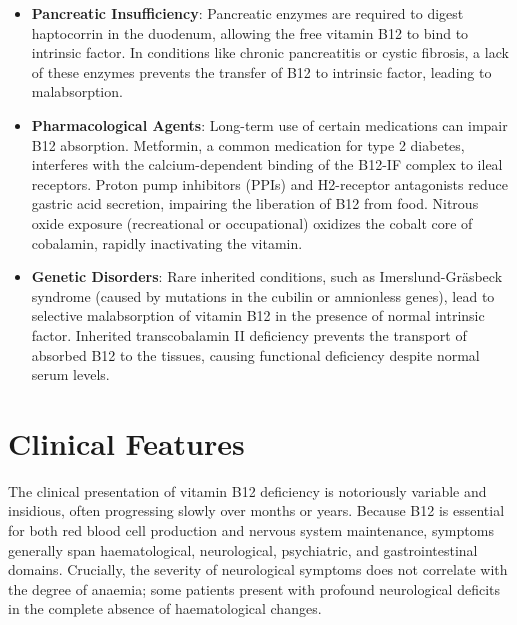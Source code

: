\begin{itemize}
    \item \textbf{Pancreatic Insufficiency}: Pancreatic enzymes are required to digest haptocorrin in the duodenum, allowing the free vitamin B12 to bind to intrinsic factor. In conditions like chronic pancreatitis or cystic fibrosis, a lack of these enzymes prevents the transfer of B12 to intrinsic factor, leading to malabsorption.
    \item \textbf{Pharmacological Agents}: Long-term use of certain medications can impair B12 absorption. Metformin, a common medication for type 2 diabetes, interferes with the calcium-dependent binding of the B12-IF complex to ileal receptors. Proton pump inhibitors (PPIs) and H2-receptor antagonists reduce gastric acid secretion, impairing the liberation of B12 from food. Nitrous oxide exposure (recreational or occupational) oxidizes the cobalt core of cobalamin, rapidly inactivating the vitamin.
    \item \textbf{Genetic Disorders}: Rare inherited conditions, such as Imerslund-Gräsbeck syndrome (caused by mutations in the cubilin or amnionless genes), lead to selective malabsorption of vitamin B12 in the presence of normal intrinsic factor. Inherited transcobalamin II deficiency prevents the transport of absorbed B12 to the tissues, causing functional deficiency despite normal serum levels.
\end{itemize}

\section*{Clinical Features}
The clinical presentation of vitamin B12 deficiency is notoriously variable and insidious, often progressing slowly over months or years. Because B12 is essential for both red blood cell production and nervous system maintenance, symptoms generally span haematological, neurological, psychiatric, and gastrointestinal domains. Crucially, the severity of neurological symptoms does not correlate with the degree of anaemia; some patients present with profound neurological deficits in the complete absence of haematological changes.

